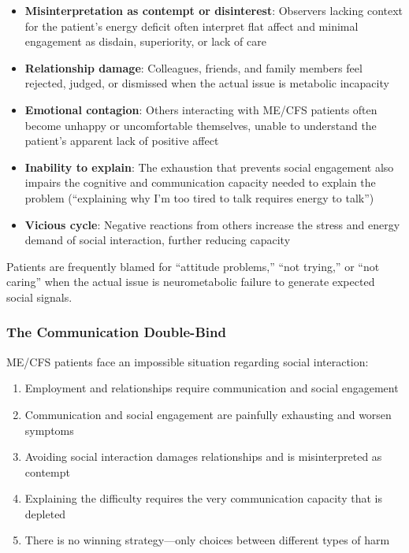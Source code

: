 \begin{itemize}
    \item \textbf{Misinterpretation as contempt or disinterest}: Observers lacking context for the patient's energy deficit often interpret flat affect and minimal engagement as disdain, superiority, or lack of care
    \item \textbf{Relationship damage}: Colleagues, friends, and family members feel rejected, judged, or dismissed when the actual issue is metabolic incapacity
    \item \textbf{Emotional contagion}: Others interacting with ME/CFS patients often become unhappy or uncomfortable themselves, unable to understand the patient's apparent lack of positive affect
    \item \textbf{Inability to explain}: The exhaustion that prevents social engagement also impairs the cognitive and communication capacity needed to explain the problem (``explaining why I'm too tired to talk requires energy to talk'')
    \item \textbf{Vicious cycle}: Negative reactions from others increase the stress and energy demand of social interaction, further reducing capacity
\end{itemize}

Patients are frequently blamed for ``attitude problems,'' ``not trying,'' or ``not caring'' when the actual issue is neurometabolic failure to generate expected social signals.

\subsubsection{The Communication Double-Bind}

ME/CFS patients face an impossible situation regarding social interaction:

\begin{enumerate}
    \item Employment and relationships require communication and social engagement
    \item Communication and social engagement are painfully exhausting and worsen symptoms
    \item Avoiding social interaction damages relationships and is misinterpreted as contempt
    \item Explaining the difficulty requires the very communication capacity that is depleted
    \item There is no winning strategy---only choices between different types of harm
\end{enumerate}

